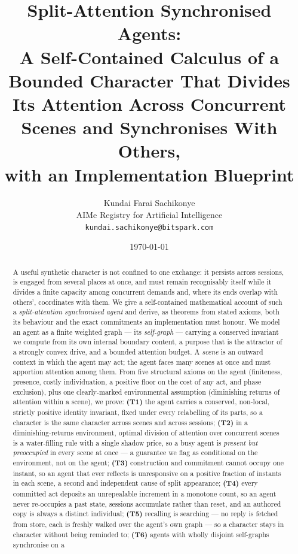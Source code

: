 \documentclass[11pt,twocolumn,a4paper]{article}
\title{\textbf{Split-Attention Synchronised Agents:\\
A Self-Contained Calculus of a Bounded Character That Divides Its
Attention Across Concurrent Scenes and Synchronises With Others,\\
with an Implementation Blueprint}}
\author{Kundai Farai Sachikonye\\[2pt]
\small AIMe Registry for Artificial Intelligence\\
\small \texttt{kundai.sachikonye@bitspark.com}}
\date{\today}
\begin{document}
\maketitle

\begin{abstract}
\noindent
A useful synthetic character is not confined to one exchange: it persists
across sessions, is engaged from several places at once, and must remain
recognisably itself while it divides a finite capacity among concurrent
demands and, where its ends overlap with others', coordinates with them.
We give a self-contained mathematical account of such a
\emph{split-attention synchronised agent} and derive, as theorems from
stated axioms, both its behaviour and the exact commitments an
implementation must honour. We model an agent as a finite weighted graph
--- its \emph{self-graph} --- carrying a conserved invariant we compute
from its own internal boundary content, a purpose that is the attractor
of a strongly convex drive, and a bounded attention budget. A
\emph{scene} is an outward context in which the agent may act; the agent
faces many scenes at once and must apportion attention among them. From
five structural axioms on the agent (finiteness, presence, costly
individuation, a positive floor on the cost of any act, and phase
exclusion), plus one clearly-marked environmental assumption
(diminishing returns of attention within a scene), we prove:
\textbf{(T1)} the agent carries a conserved, non-local, strictly positive
identity invariant, fixed under every relabelling of its parts, so a
character is the same character across scenes and across sessions;
\textbf{(T2)} in a diminishing-returns environment, optimal division of
attention over concurrent scenes is a water-filling rule with a single
shadow price, so a busy agent is \emph{present but preoccupied} in every
scene at once --- a guarantee we flag as conditional on the environment, not
on the agent;
\textbf{(T3)} construction and commitment cannot occupy one instant, so
an agent that ever reflects is unresponsive on a positive fraction of
instants in each scene, a second and independent cause of split
appearance;
\textbf{(T4)} every committed act deposits an unrepealable increment in a
monotone count, so an agent never re-occupies a past state, sessions
accumulate rather than reset, and an authored copy is always a distinct
individual;
\textbf{(T5)} recalling is searching --- no reply is fetched from store,
each is freshly walked over the agent's own graph --- so a character stays
in character without being reminded to;
\textbf{(T6)} agents with wholly disjoint self-graphs synchronise on a

\end{abstract}
\end{document}
